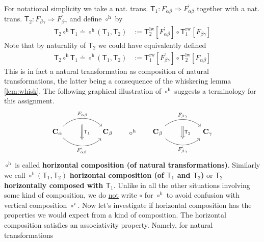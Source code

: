 For notational simplicity we take a nat. trans. $\mathsf{T}_{1} \colon F_{\alpha\beta} \Rightarrow F_{\alpha\beta}^{\backprime}$ together with a nat. trans. $\mathsf{T}_{2} \colon F_{\beta\gamma} \Rightarrow F_{\beta\gamma}^{\backprime}$ and define $\circ^{\textrm{h}}$ by
\begin{align*}
  \mathsf{T}_{2} \circ^{\textrm{h}} \mathsf{T}_{1}
  \doteq
  \circ^{\textrm{h}}(\mathsf{T}_{1},\mathsf{T}_{2})
  &:=
  \mathsf{T}_{2}^{\mathrm{lw}}
  [F_{\alpha\beta}^{\backprime}]
  \circ
  \mathsf{T}_{1}^{\mathrm{rw}}
  [F_{\beta\gamma}]
\end{align*}
Note that by naturality of $\mathsf{T}_{2}$ we could have equivalently defined
\begin{align*}
  \mathsf{T}_{2} \circ^{\textrm{h}} \mathsf{T}_{1}
  \doteq
  \circ^{\textrm{h}}(\mathsf{T}_{1},\mathsf{T}_{2})
  &:=
  \mathsf{T}_{1}^{\mathrm{rw}}
  [F_{\beta\gamma}^{\backprime}]
  \circ
  \mathsf{T}_{2}^{\mathrm{lw}}
  [F_{\alpha\beta}]
\end{align*}
This is in fact a natural transformation as composition of natural transformations, the latter being a consequence of the whiskering lemma \ref{lem:whisk}. The following graphical illustration of $\circ^{\textrm{h}}$ suggests a terminology for this assignment.
\[
\begin{tikzcd}[sep=huge]
  \mathbf{C}_{\alpha}
  \arrow[bend left=45]{r}[name=fab]{F_{\alpha\beta}}
  \arrow[bend right=45,swap]{r}[name=fab*]{F_{\alpha\beta}^{\backprime}}
  &
  \mathbf{C}_{\beta}
  \arrow[phantom]{r}{\circ^{\textrm{h}}}
  &
  \mathbf{C}_{\beta}
  \arrow[bend left=40]{r}[name=fbc]{F_{\beta\gamma}}
  \arrow[bend right=40,swap]{r}[name=fbc*]{F_{\beta\gamma}^{\backprime}}
  &
  \mathbf{C}_{\gamma}
  \arrow[from=fab,to=fab*,shorten <= 9pt,shorten >= 9pt,Rightarrow]{d}{\mathsf{T}_{1}}
  \arrow[from=fbc,to=fbc*,shorten <= 9pt,shorten >= 9pt,Rightarrow]{d}{\mathsf{T}_{2}}
\end{tikzcd}
\]
$\circ^{\textrm{h}}$ is called \textbf{horizontal composition (of natural transformations)}. Similarly we call $\circ^{\textrm{h}}(\mathsf{T}_{1},\mathsf{T}_{2})$ \textbf{horizontal composition (of $\mathsf{T}_{1}$ and $\mathsf{T}_{2}$)} or \textbf{$\mathsf{T}_{2}$ horizontally composed with $\mathsf{T}_{1}$}. Unlike in all the other situations involving some kind of composition, we do \underline{not} write $\circ$ for $\circ^{\textrm{h}}$ to avoid confusion with vertical composition $\circ^{\textrm{v}}$. Now let's investigate if horizontal composition has the properties we would expect from a kind of composition. The horizontal composition satisfies an associativity property. Namely, for natural transformations
